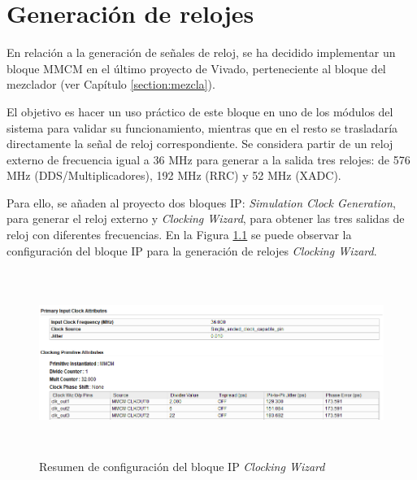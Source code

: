 \chapter{Generación de relojes}
\label{cha:mmcm}

En relación a la generación de señales de reloj, se ha decidido implementar un bloque MMCM en el último proyecto de Vivado, perteneciente al bloque del mezclador (ver Capítulo \ref{section:mezcla}).


\vspace{3mm}

El objetivo es hacer un uso práctico de este bloque en uno de los módulos del sistema para validar su funcionamiento, mientras que en el resto se trasladaría directamente la señal de reloj correspondiente. Se considera partir de un reloj externo de frecuencia igual a 36 MHz para generar a la salida tres relojes: de 576 MHz (DDS/Multiplicadores), 192 MHz (RRC)
y 52 MHz (XADC). 

\vspace{3mm}

Para ello, se añaden al proyecto dos bloques IP: \textit{Simulation Clock Generation}, para generar el reloj externo y \textit{Clocking Wizard}, para obtener las tres salidas de reloj con diferentes frecuencias. En la Figura \ref{fig:mmcm} se puede observar la configuración del bloque IP para la generación de relojes \textit{Clocking Wizard}.

\vspace{3mm}

\begin{figure}[h]
	\centering
	\includegraphics[width=1\textwidth, height=6cm]{img/diseno/mmcm.PNG}
	\caption{Resumen de configuración del bloque IP \textit{Clocking Wizard}}
	\label{fig:mmcm}
\end{figure}

\pagebreak

